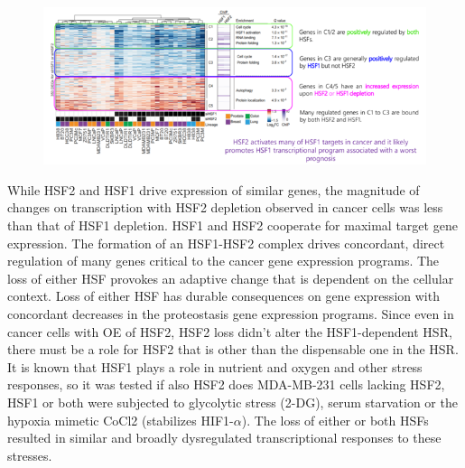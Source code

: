 \begin{figure}
\centering
\includegraphics[width=\textwidth]{../_resources/Screen_Shot_2022-12-20_at_11-45-23.png}
\caption{}
\end{figure}

While HSF2 and HSF1 drive expression of similar genes, the magnitude of changes on transcription with HSF2 depletion observed in cancer cells
was less than that of HSF1 depletion. HSF1 and HSF2 cooperate for maximal target gene expression. The formation of an HSF1-HSF2 complex drives concordant, direct regulation of many genes critical to the cancer gene expression programs.
The loss of either HSF provokes an adaptive change that is dependent on the cellular context. Loss of either HSF has durable consequences on gene expression with concordant decreases in the proteostasis gene expression programs. Since even in cancer cells with OE of HSF2, HSF2 loss didn’t alter the HSF1-dependent HSR, there must be a role for HSF2 that is other than the dispensable one in the HSR.
It is known that HSF1 plays a role in nutrient and oxygen and other stress responses, so it was tested if also HSF2 does MDA-MB-231 cells lacking HSF2, HSF1 or both were subjected to glycolytic stress (2-DG), serum starvation or the hypoxia mimetic CoCl2 (stabilizes HIF1-$\alpha$). The loss of either or both HSFs resulted in similar and broadly dysregulated transcriptional responses to these stresses.

